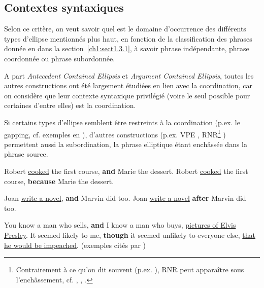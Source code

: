 \subsection{Contextes syntaxiques} \label{ch1:sect1.4.2}

Selon ce critère, on veut savoir quel est le domaine d’occurrence des différents types d’ellipse mentionnés plus haut, en fonction de la classification des phrases donnée en  dans la section~\ref{ch1:sect1.3.1}, à savoir phrase indépendante, phrase coordonnée ou phrase subordonnée.

A part \textit{Antecedent Contained Ellipsis} et \textit{Argument Contained Ellipsis}, toutes les autres constructions ont été largement étudiées en lien avec la coordination, car on considère que leur contexte syntaxique privilégié (voire le seul possible pour certaines d’entre elles) est la coordination.

Si certains types d’ellipse semblent être restreints à la coordination (p.ex. le gapping, cf. exemples en ), d’autres constructions (p.ex. VPE , RNR\footnote{Contrairement à ce qu’on dit souvent (p.ex. \citealt{Haspelmath2007}), RNR peut apparaître sous l’enchâssement, cf. \citet{ChavesEtAl2008}, \citet{Bilbiie2013b}, \citet{Chaves2014}.} ) permettent aussi la subordination, la phrase elliptique étant enchâssée dans la phrase source. 

  
\ea \label{ch1:ex82}
\ea  Robert \uline{cooked} the first course, \textbf{and} Marie the dessert. 
\ex  *Robert \uline{cooked} the first course, \textbf{because} Marie the dessert.
\z
\z

\ea \label{ch1:ex83}
\ea  Joan \uline{write a novel}, \textbf{and} Marvin did too. 
\ex  Joan \uline{write a novel} \textbf{after} Marvin did too.   
\z
\z

\ea \label{ch1:ex84}
\ea  You know a man who sells, \textbf{and} I know a man who buys, \uline{pictures of Elvis Presley}. 
\ex  It seemed likely to me, \textbf{though} it seemed unlikely to everyone else, \uline{that he would be impeached}. (exemples cités par \citealt{ChavesEtAl2008}) 
\z
\z

